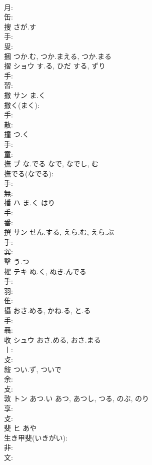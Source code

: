 \documentclass[8pt]{extreport}
\begin{document}
\begin{CJK}{UTF8}{min}
\\	月: 
\\	缶: 
\\	搜		さが.す				
\\	手: 
\\	叟: 
\\	摑		つか.む, つか.まえる, つか.まる				
\\	摺	ショウ	す.る, ひだ	する, ずり	
\\	手: 
\\	習: 
\\	撒	サン	ま.く		
\\	撒く(まく): 
\\	手: 
\\	散: 
\\	撞		つ.く			
\\	手: 
\\	童: 
\\	撫	ブ	な.でる	なで, なでし, む	
\\	撫でる(なでる): 
\\	手: 
\\	無: 
\\	播	ハ	ま.く	はり	
\\	手: 
\\	番: 
\\	撰	サン	せん.する, えら.む, えら.ぶ		
\\	手: 
\\	巽: 
\\	擊		う.つ				
\\	擢	テキ	ぬ.く, ぬき.んでる		
\\	手: 
\\	羽: 
\\	隹: 
\\	攝		おさ.める, かね.る, と.る				
\\	手: 
\\	聶: 
\\	收	シュウ	おさ.める, おさ.まる		
\\	丨: 
\\	攴: 
\\	敍		つい.ず, ついで				
\\	余: 
\\	攴: 
\\	敦	トン	あつ.い	あつ, あつし, つる, のぶ, のり	
\\	享: 
\\	攴: 
\\	斐	ヒ		あや	
\\	生き甲斐(いきがい): 
\\	非: 
\\	文: 

\end{CJK}
\end{document}
